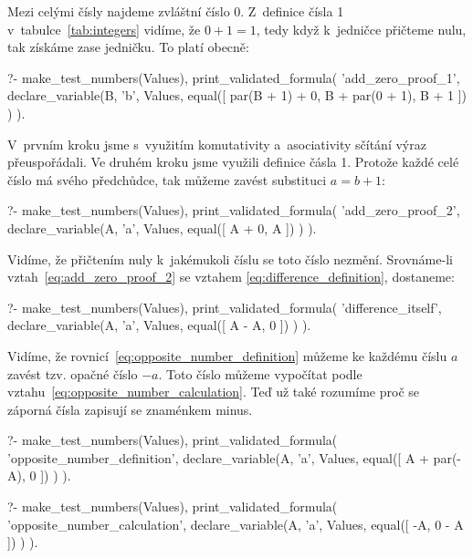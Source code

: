 Mezi celými čísly najdeme zvláštní číslo 0. Z~definice čísla 1 v~tabulce~\ref{tab:integers} vidíme, že \(0 + 1 = 1\), tedy když k~jedničce přičteme nulu, tak získáme zase jedničku. To platí obecně:

\begin{prolog}
?-	make_test_numbers(Values),
	print_validated_formula(
		'add_zero_proof_1',
		declare_variable(B, 'b', Values,
			equal([
				par(B + 1) + 0,
				B + par(0 + 1),
				B + 1
			])
		)
	).
\end{prolog}

V~prvním kroku jsme s~využitím komutativity a~asociativity sčítání výraz přeuspořádali. Ve druhém kroku jsme využili definice čásla 1. Protože každé celé číslo má svého předchůdce, tak můžeme zavést substituci \(a = b + 1\):

\begin{prolog}
?-	make_test_numbers(Values),
	print_validated_formula(
		'add_zero_proof_2',
		declare_variable(A, 'a', Values,
			equal([
				A + 0,
				A
			])
		)
	).
\end{prolog}

Vidíme, že přičtením nuly k~jakémukoli číslu se toto číslo nezmění.
Srovnáme-li vztah~\eqref{eq:add_zero_proof_2} se vztahem \eqref{eq:difference_definition}, dostaneme:

\begin{prolog}
?-	make_test_numbers(Values),
	print_validated_formula(
		'difference_itself',
		declare_variable(A, 'a', Values,
			equal([
				A - A,
				0
			])
		)
	).
\end{prolog}

Vidíme, že rovnicí~\eqref{eq:opposite_number_definition} můžeme ke každému číslu \(a\) zavést tzv. opačné číslo \(-a\). Toto číslo můžeme vypočítat podle vztahu~\eqref{eq:opposite_number_calculation}. Teď už také rozumíme proč se záporná čísla zapisují se znaménkem minus.

\begin{prolog}
?-	make_test_numbers(Values),
	print_validated_formula(
		'opposite_number_definition',
		declare_variable(A, 'a', Values,
			equal([
				A + par(-A),
				0
			])
		)
	).
\end{prolog}
\begin{prolog}
?-	make_test_numbers(Values),
	print_validated_formula(
		'opposite_number_calculation',
		declare_variable(A, 'a', Values,
			equal([
				-A,
				0 - A
			])
		)
	).
\end{prolog}

